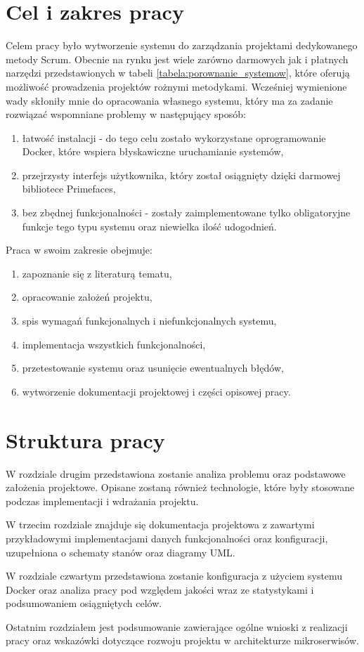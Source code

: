 \section{Cel i zakres pracy}

Celem pracy było wytworzenie systemu do zarządzania projektami dedykowanego metody Scrum. Obecnie na rynku jest wiele zarówno darmowych jak i płatnych narzędzi przedstawionych w tabeli \ref{tabela:porownanie_systemow}, które oferują możliwość prowadzenia projektów rożnymi metodykami. Wcześniej wymienione wady skłoniły mnie do opracowania własnego systemu, który ma za zadanie rozwiązać wspomniane problemy w następujący sposób:
\begin{enumerate}
	\item łatwość instalacji - do tego celu zostało wykorzystane oprogramowanie Docker, które wspiera błyskawiczne uruchamianie systemów,
	\item przejrzysty interfejs użytkownika, który został osiągnięty dzięki darmowej bibliotece Primefaces,
	\item bez zbędnej funkcjonalności - zostały zaimplementowane tylko obligatoryjne funkcje tego typu systemu oraz niewielka ilość udogodnień.
\end{enumerate}

Praca w swoim zakresie obejmuje:
\begin{enumerate}
	\item zapoznanie się z literaturą tematu,
	\item opracowanie założeń projektu,
	\item spis wymagań funkcjonalnych i niefunkcjonalnych systemu,
	\item implementacja wszystkich funkcjonalności,
	\item przetestowanie systemu oraz usunięcie ewentualnych błędów,
	\item wytworzenie dokumentacji projektowej i części opisowej pracy.
	
\end{enumerate}


\section{Struktura pracy}
W rozdziale drugim przedstawiona zostanie analiza problemu oraz podstawowe założenia projektowe. Opisane zostaną również technologie, które były stosowane podczas implementacji i wdrażania projektu. 

W trzecim rozdziale znajduje się dokumentacja projektowa z zawartymi przykładowymi implementacjami danych funkcjonalności oraz konfiguracji, uzupełniona o schematy stanów oraz diagramy UML. 

W rozdziale czwartym przedstawiona zostanie konfiguracja z użyciem systemu Docker oraz analiza pracy pod względem jakości wraz ze statystykami i podsumowaniem osiągniętych celów.

Ostatnim rozdziałem jest podsumowanie zawierające ogólne wnioski z realizacji pracy oraz wskazówki dotyczące rozwoju projektu w architekturze mikroserwisów.